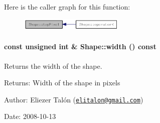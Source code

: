 Here is the caller graph for this function:\nopagebreak
\begin{figure}[H]
\begin{center}
\leavevmode
\includegraphics[width=141pt]{class_shape_063c4934d8c1cd4b02e4e3e4a604f62e_icgraph}
\end{center}
\end{figure}
\hypertarget{class_shape_6773dfedb96ef750e5469e22d51ecf0f}{
\paragraph[{width}]{\setlength{\rightskip}{0pt plus 5cm}const unsigned int \& Shape::width () const}\hfill}
\label{class_shape_6773dfedb96ef750e5469e22d51ecf0f}


Returns the width of the shape. 

\begin{Desc}
\item[Returns:]Width of the shape in pixels\end{Desc}
\begin{Desc}
\item[Author:]Eliezer Talón (\href{mailto:elitalon@gmail.com}{\tt elitalon@gmail.com}) \end{Desc}
\begin{Desc}
\item[Date:]2008-10-13 \end{Desc}
